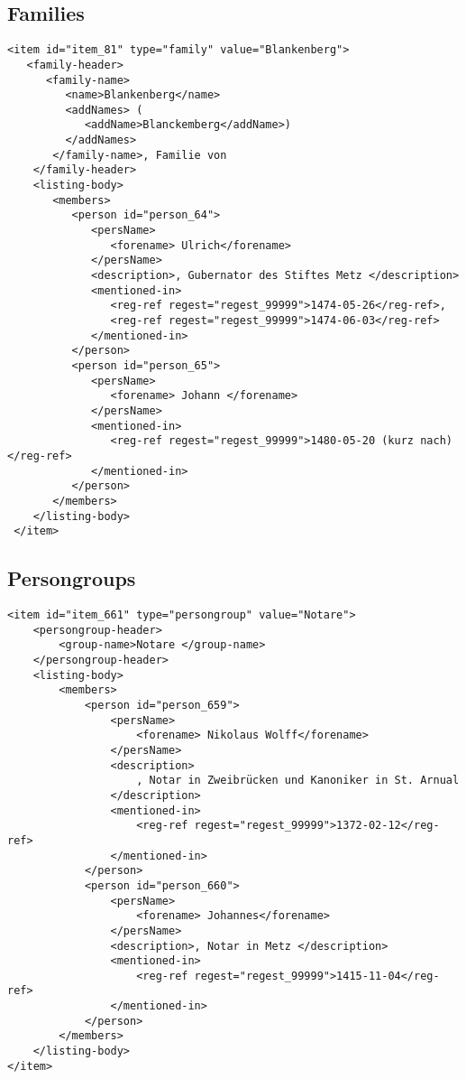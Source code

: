 \subsection{Families}
\label{sec:family-examples}

\begin{verbatim}
<item id="item_81" type="family" value="Blankenberg">
   <family-header>
      <family-name>
         <name>Blankenberg</name>
         <addNames> (
            <addName>Blanckemberg</addName>)
         </addNames>
       </family-name>, Familie von
    </family-header>
    <listing-body>
       <members>
          <person id="person_64">
             <persName>
                <forename> Ulrich</forename>
             </persName>
             <description>, Gubernator des Stiftes Metz </description>
             <mentioned-in>
                <reg-ref regest="regest_99999">1474-05-26</reg-ref>,
                <reg-ref regest="regest_99999">1474-06-03</reg-ref>
             </mentioned-in>
          </person>
          <person id="person_65">
             <persName>
                <forename> Johann </forename>
             </persName>
             <mentioned-in>
                <reg-ref regest="regest_99999">1480-05-20 (kurz nach)</reg-ref>
             </mentioned-in>
          </person>
       </members>
    </listing-body>
 </item>
\end{verbatim}

\subsection{Persongroups}
\label{sec:persongroup-examples}

\begin{verbatim}
<item id="item_661" type="persongroup" value="Notare">
    <persongroup-header>
        <group-name>Notare </group-name>
    </persongroup-header>
    <listing-body>
        <members>
            <person id="person_659">
                <persName>
                    <forename> Nikolaus Wolff</forename>
                </persName>
                <description>
                    , Notar in Zweibrücken und Kanoniker in St. Arnual
                </description>
                <mentioned-in>
                    <reg-ref regest="regest_99999">1372-02-12</reg-ref>
                </mentioned-in>
            </person>
            <person id="person_660">
                <persName>
                    <forename> Johannes</forename>
                </persName>
                <description>, Notar in Metz </description>
                <mentioned-in>
                    <reg-ref regest="regest_99999">1415-11-04</reg-ref>
                </mentioned-in>
            </person>
        </members>
    </listing-body>
</item>
\end{verbatim}
